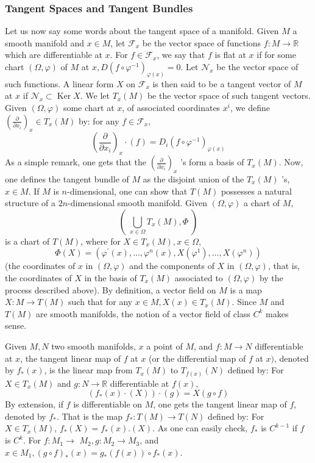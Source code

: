 \documentclass[12pt,hyperref,a4paper,UTF8]{ctexart}
\begin{document}
\subsubsection{Tangent Spaces and Tangent Bundles}
Let us now say some words about the tangent space of a manifold. Given $M$ a smooth manifold and $x \in M$, let $\mathcal{F}_x$ be the vector space of functions $f: M \rightarrow \mathbb{R}$ which are differentiable at $x$. For $f \in \mathcal{F}_x$, we say that $f$ is flat at $x$ if for some chart $(\Omega, \varphi)$ of $M$ at $x, D\left(f \circ \varphi^{-1}\right)_{\varphi(x)}=0$. Let $\mathcal{N}_x$ be the vector space of such functions. A linear form $X$ on $\mathcal{F}_x$ is then said to be a tangent vector of $M$ at $x$ if $\mathcal{N}_x \subset \operatorname{Ker} X$. We let $T_x(M)$ be the vector space of such tangent vectors. Given
$(\Omega, \varphi)$ some chart at $x$, of associated coordinates $x^i$, we define $\left(\frac{\partial}{\partial x_i}\right)_x \in T_x(M)$ by: for any $f \in \mathcal{F}_x$,
$$
\left(\frac{\partial}{\partial x_i}\right)_x \cdot(f)=D_i\left(f \circ \varphi^{-1}\right)_{\varphi(x)}
$$
As a simple remark, one gets that the $\left(\frac{\partial}{\partial x_i}\right)_x$ 's form a basis of $T_{{x}}(M)$. Now, one defines the tangent bundle of $M$ as the disjoint union of the $T_x(M)$ 's, $x \in M$. If $M$ is $n$-dimensional, one can show that $T(M)$ possesses a natural structure of a $2 n$-dimensional smooth manifold. Given $(\Omega, \varphi)$ a chart of $M$,
$$
\left(\; \bigcup_{x \in \Omega} T_x(M), \Phi\; \right)
$$
is a chart of $T(M)$, where for $X \in T_{{x}}(M), x \in \Omega$,
$$
\Phi(X)=\left(\varphi^{\prime}(x), \ldots, \varphi^n(x), X\left(\varphi^1\right), \ldots, X\left(\varphi^n\right)\right)
$$
(the coordinates of $x$ in $(\Omega, \varphi)$ and the components of $X$ in $(\Omega, \varphi)$, that is, the coordinates of $X$ in the basis of $T_x(M)$ associated to $(\Omega, \varphi)$ by the process described above). By definition, a vector field on $M$ is a map $X: M \rightarrow T(M)$ such that for any $x \in M, X(x) \in T_x(M)$. Since $M$ and $T(M)$ are smooth manifolds, the notion of a vector field of class $C^k$ makes sense.

\vskip 3pt
Given $M, N$ two smooth manifolds, $x$ a point of $M$, and $f: M \rightarrow N$ differentiable at $x$, the tangent linear map of $f$ at $x$ (or the differential map of $f$ at $x)$, denoted by $f_*(x)$, is the linear map from $T_{{x}}(M)$ to $T_{f({x})}(N)$ defined by: For $X \in T_x(M)$ and $g: N \rightarrow \mathbb{R}$ differentiable at $f(x)$,
$$
\left(f_*(x) \cdot(X)\right) \cdot(g)=X(g \circ f)
$$
By extension, if $f$ is differentiable on $M$, one gets the tangent linear map of $f$, denoted by $f_*$. That is the map $f_*: T(M) \rightarrow T(N)$ defined by: For $X \in T_x(M)$, $f_*(X)=f_*(x) .(X)$. As one can easily check, $f_*$ is $C^{k-1}$ if $f$ is $C^k$. For $f: M_1 \rightarrow$ $M_2, g: M_2 \rightarrow M_3$, and $x \in M_1,(g \circ f)_*(x)=g_*(f(x)) \circ f_*(x)$.
\end{document}
